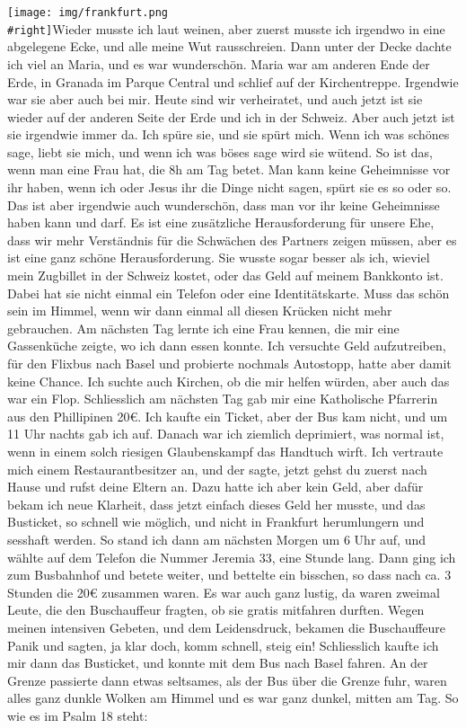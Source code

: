 \documentclass[
]{article}
\begin{document}
\texttt{[image: img/frankfurt.png\\\#right]}Wieder musste ich laut weinen,
aber zuerst musste ich irgendwo in eine abgelegene Ecke, und alle meine
Wut rausschreien. Dann unter der Decke dachte ich viel an Maria, und es
war wunderschön. Maria war am anderen Ende der Erde, in Granada im
Parque Central und schlief auf der Kirchentreppe. Irgendwie war sie aber
auch bei mir. Heute sind wir verheiratet, und auch jetzt ist sie wieder
auf der anderen Seite der Erde und ich in der Schweiz. Aber auch jetzt
ist sie irgendwie immer da. Ich spüre sie, und sie spürt mich. Wenn ich
was schönes sage, liebt sie mich, und wenn ich was böses sage wird sie
wütend. So ist das, wenn man eine Frau hat, die 8h am Tag betet. Man
kann keine Geheimnisse vor ihr haben, wenn ich oder Jesus ihr die Dinge
nicht sagen, spürt sie es so oder so. Das ist aber irgendwie auch
wunderschön, dass man vor ihr keine Geheimnisse haben kann und darf. Es
ist eine zusätzliche Herausforderung für unsere Ehe, dass wir mehr
Verständnis für die Schwächen des Partners zeigen müssen, aber es ist
eine ganz schöne Herausforderung. Sie wusste sogar besser als ich,
wieviel mein Zugbillet in der Schweiz kostet, oder das Geld auf meinem
Bankkonto ist. Dabei hat sie nicht einmal ein Telefon oder eine
Identitätskarte. Muss das schön sein im Himmel, wenn wir dann einmal all
diesen Krücken nicht mehr gebrauchen. Am nächsten Tag lernte ich eine
Frau kennen, die mir eine Gassenküche zeigte, wo ich dann essen konnte.
Ich versuchte Geld aufzutreiben, für den Flixbus nach Basel und
probierte nochmals Autostopp, hatte aber damit keine Chance. Ich suchte
auch Kirchen, ob die mir helfen würden, aber auch das war ein Flop.
Schliesslich am nächsten Tag gab mir eine Katholische Pfarrerin aus den
Phillipinen 20€. Ich kaufte ein Ticket, aber der Bus kam nicht, und um
11 Uhr nachts gab ich auf. Danach war ich ziemlich deprimiert, was
normal ist, wenn in einem solch riesigen Glaubenskampf das Handtuch
wirft. Ich vertraute mich einem Restaurantbesitzer an, und der sagte,
jetzt gehst du zuerst nach Hause und rufst deine Eltern an. Dazu hatte
ich aber kein Geld, aber dafür bekam ich neue Klarheit, dass jetzt
einfach dieses Geld her musste, und das Busticket, so schnell wie
möglich, und nicht in Frankfurt herumlungern und sesshaft werden. So
stand ich dann am nächsten Morgen um 6 Uhr auf, und wählte auf dem
Telefon die Nummer Jeremia 33, eine Stunde lang. Dann ging ich zum
Busbahnhof und betete weiter, und bettelte ein bisschen, so dass nach
ca. 3 Stunden die 20€ zusammen waren. Es war auch ganz lustig, da waren
zweimal Leute, die den Buschauffeur fragten, ob sie gratis mitfahren
durften. Wegen meinen intensiven Gebeten, und dem Leidensdruck, bekamen
die Buschauffeure Panik und sagten, ja klar doch, komm schnell, steig
ein! Schliesslich kaufte ich mir dann das Busticket, und konnte mit dem
Bus nach Basel fahren. An der Grenze passierte dann etwas seltsames, als
der Bus über die Grenze fuhr, waren alles ganz dunkle Wolken am Himmel
und es war ganz dunkel, mitten am Tag. So wie es im Psalm 18 steht:
\end{document}
